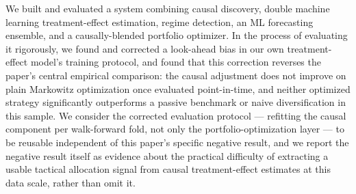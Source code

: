 \documentclass[10pt,twocolumn]{article}
\begin{document}
We built and evaluated a system combining causal discovery, double
machine learning treatment-effect estimation, regime detection, an ML
forecasting ensemble, and a causally-blended portfolio optimizer. In the
process of evaluating it rigorously, we found and corrected a
look-ahead bias in our own treatment-effect model's training protocol,
and found that this correction reverses the paper's central empirical
comparison: the causal adjustment does not improve on plain Markowitz
optimization once evaluated point-in-time, and neither optimized
strategy significantly outperforms a passive benchmark or naive
diversification in this sample. We consider the corrected evaluation
protocol --- refitting the causal component per walk-forward fold, not
only the portfolio-optimization layer --- to be reusable independent of
this paper's specific negative result, and we report the negative
result itself as evidence about the practical difficulty of extracting
a usable tactical allocation signal from causal treatment-effect
estimates at this data scale, rather than omit it.



\end{document}

